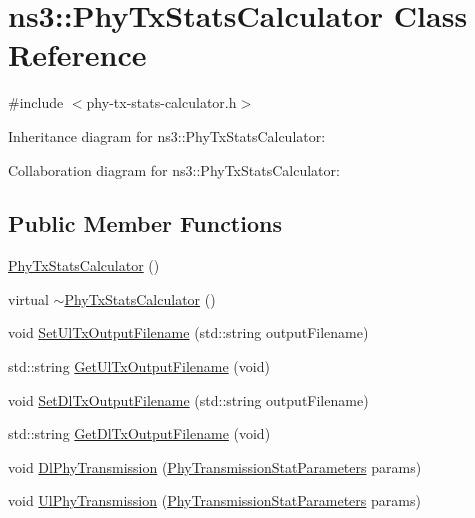 \hypertarget{classns3_1_1PhyTxStatsCalculator}{}\section{ns3\+:\+:Phy\+Tx\+Stats\+Calculator Class Reference}
\label{classns3_1_1PhyTxStatsCalculator}


{\ttfamily \#include $<$phy-\/tx-\/stats-\/calculator.\+h$>$}



Inheritance diagram for ns3\+:\+:Phy\+Tx\+Stats\+Calculator\+:


Collaboration diagram for ns3\+:\+:Phy\+Tx\+Stats\+Calculator\+:
\subsection*{Public Member Functions}
\begin{DoxyCompactItemize}
\item 
\hyperlink{classns3_1_1PhyTxStatsCalculator_a5b30c7e012243ab3d30c3371c5bf8a8a}{Phy\+Tx\+Stats\+Calculator} ()
\item 
virtual \hyperlink{classns3_1_1PhyTxStatsCalculator_a2307ed89276721c0fc7c56595ebfd395}{$\sim$\+Phy\+Tx\+Stats\+Calculator} ()
\item 
void \hyperlink{classns3_1_1PhyTxStatsCalculator_a36b157a434ff7095504015595e24e80f}{Set\+Ul\+Tx\+Output\+Filename} (std\+::string output\+Filename)
\item 
std\+::string \hyperlink{classns3_1_1PhyTxStatsCalculator_aeb929250f3932735ed8d7617f827cccc}{Get\+Ul\+Tx\+Output\+Filename} (void)
\item 
void \hyperlink{classns3_1_1PhyTxStatsCalculator_a228593b9aab8e7ddc3b20f16a12cdc88}{Set\+Dl\+Tx\+Output\+Filename} (std\+::string output\+Filename)
\item 
std\+::string \hyperlink{classns3_1_1PhyTxStatsCalculator_ae0526cc38231c19c53cb3ca6141aa99d}{Get\+Dl\+Tx\+Output\+Filename} (void)
\item 
void \hyperlink{classns3_1_1PhyTxStatsCalculator_a8790d9b7bd878ba60471f56e0c892471}{Dl\+Phy\+Transmission} (\hyperlink{structns3_1_1PhyTransmissionStatParameters}{Phy\+Transmission\+Stat\+Parameters} params)
\item 
void \hyperlink{classns3_1_1PhyTxStatsCalculator_ac62f36c43267be17739ea60d4a21f24c}{Ul\+Phy\+Transmission} (\hyperlink{structns3_1_1PhyTransmissionStatParameters}{Phy\+Transmission\+Stat\+Parameters} params)
\end{DoxyCompactItemize}
